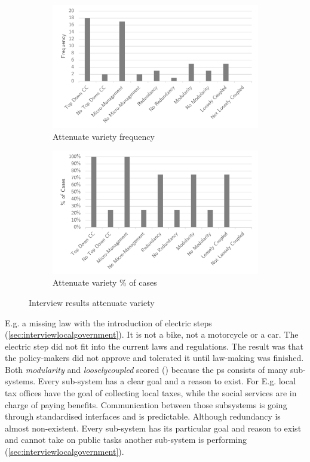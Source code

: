 \begin{figure}[H]
	\centering
	\begin{subfigure}[H]{0.5\textwidth}
		\centering
		\includegraphics[width=0.95\linewidth]{images/attenuate_frequency}
		\caption[Attenuate variety frequency]{Attenuate variety frequency}
		\label{fig:attenuatefrequency}
	\end{subfigure}%
	\begin{subfigure}[H]{0.5\textwidth}
		\centering
		\includegraphics[width=0.95\linewidth]{images/attenuate_cases}
		\caption[Attenuate variety \% of cases]{Attenuate variety \% of cases}
		\label{fig:attenuatecases}
	\end{subfigure}
	\caption[Interview results attenuate variety]{Interview results attenuate variety}
	\label{fig:interviewattenuatevariety}
\end{figure}
E.g. a missing law with the introduction of electric steps (\cref{sec:interviewlocalgovernment}). It is not a bike, not a motorcycle or a car. The electric step did not fit into the current laws and regulations. The result was that the policy-makers did not approve and tolerated it until law-making was finished. Both \textit{\gls{modularity}} and \textit{\gls{looselycoupled}} scored () because the \gls{ps} consists of many sub-systems. Every sub-system has a clear goal and a reason to exist. For E.g. local tax offices have the goal of collecting local taxes, while the social services are in charge of paying benefits. Communication between those subsystems is going through standardised interfaces and is predictable. Although \gls{redundancy} is almost non-existent. Every sub-system has its particular goal and reason to exist and cannot take on public tasks another sub-system is performing (\cref{sec:interviewlocalgovernment}).
